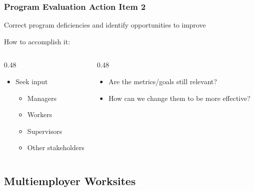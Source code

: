 \begin{frame}
	\frametitle{Program Evaluation Action Item 2}

    Correct program deficiencies and identify opportunities to improve

    \begin{block}{How to accomplish it:}
        \vspace{-1.5em}
        \begin{columns}[t]
            \begin{column}{0.48\linewidth}
                \begin{itemize}[<+- | alert@+>]
                    \item Seek input
                        \begin{itemize}
                            \item Managers
                            \item Workers
                            \item Supervisors
                            \item Other stakeholders
                        \end{itemize}
                \end{itemize}
            \end{column}
            \begin{column}{0.48\linewidth}
                \begin{itemize}[<+- | alert@+>]
                    \item Are the metrics/goals still relevant?
                    \item How can we change them to be more effective?
                \end{itemize}
            \end{column}
        \end{columns}
    \end{block}
\end{frame}

\subsection{Multiemployer Worksites}

